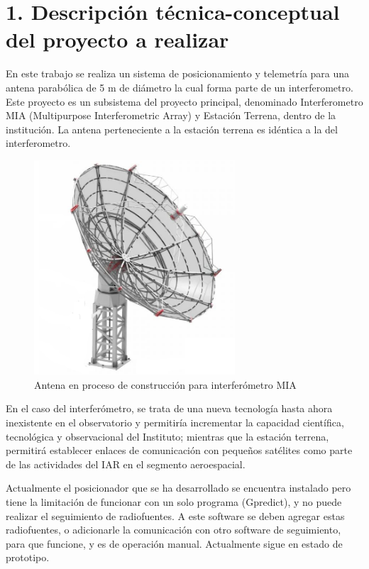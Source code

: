 \documentclass[11pt, %
codirector, %
]{charter}
\begin{document}
\section{1. Descripción técnica-conceptual del proyecto a realizar}
\label{sec:descripcion}

En este trabajo se realiza un sistema de posicionamiento y telemetría para una antena parabólica de 5 m de diámetro la cual forma parte de un interferometro. Este proyecto es un subsistema del proyecto principal, denominado Interferometro MIA (Multipurpose Interferometric Array) y Estación Terrena, dentro de la institución. La antena perteneciente a la estación terrena es idéntica a la del interferometro. 
\begin{figure}[H]
	\centering 
	\includegraphics[height = 8cm ]{Figuras/seccion_1/antena_MIA.png}
	\caption{Antena en proceso de construcción para interferómetro MIA}
	\label{fig:antena_mia}
\end{figure}


En el caso del interferómetro, se trata de una nueva tecnología hasta ahora inexistente en el observatorio y permitiría incrementar la capacidad científica, tecnológica y observacional del Instituto; mientras que la estación terrena, permitirá establecer enlaces de comunicación con pequeños satélites como parte de las actividades del IAR en el segmento aeroespacial.

Actualmente el posicionador que se ha desarrollado se encuentra instalado pero tiene la limitación de funcionar con un solo programa (Gpredict), y no puede realizar el seguimiento de radiofuentes. A este software se deben agregar estas radiofuentes, o adicionarle la comunicación con otro software de seguimiento, para que funcione, y es de operación manual. Actualmente sigue en estado de prototipo.  
\end{document}
